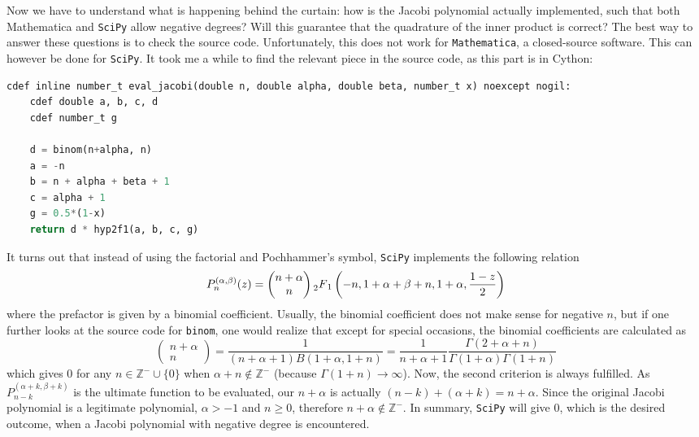 Now we have to understand what is happening behind the curtain: how is the Jacobi polynomial actually implemented, such that both Mathematica and \texttt{SciPy} allow negative degrees?
Will this guarantee that the quadrature of the inner product is correct?
The best way to answer these questions is to check the source code.
Unfortunately, this does not work for \texttt{Mathematica}, a closed-source software.
This can however be done for \texttt{SciPy}.
It took me a while to find the relevant piece in the source code, as this part is in Cython:
\begin{lstlisting}[language=Python]
cdef inline number_t eval_jacobi(double n, double alpha, double beta, number_t x) noexcept nogil:
    cdef double a, b, c, d
    cdef number_t g

    d = binom(n+alpha, n)
    a = -n
    b = n + alpha + beta + 1
    c = alpha + 1
    g = 0.5*(1-x)
    return d * hyp2f1(a, b, c, g)
\end{lstlisting}
It turns out that instead of using the factorial and Pochhammer's symbol, \texttt{SciPy} implements the following relation
\[
    P_n^{(\alpha,\beta)}(z) = \begin{pmatrix}n+\alpha \\ n\end{pmatrix}\prescript{}{2}{F}_1\left(-n, 1+\alpha+\beta+n, 1+\alpha, \frac{1-z}{2}\right)
\]
where the prefactor is given by a binomial coefficient. Usually, the binomial coefficient does not make sense for negative $n$, but if one further looks at the source code for \texttt{binom}, one would realize that except for special occasions, the binomial coefficients are calculated as
\[
    \begin{pmatrix} n + \alpha \\ n \end{pmatrix} = \frac{1}{(n + \alpha + 1)B(1 + \alpha, 1 + n)} = \frac{1}{n + \alpha + 1} \frac{\Gamma(2 + \alpha + n)}{\Gamma(1 + \alpha) \Gamma(1 + n)}
\]
which gives $0$ for any $n\in \mathbb{Z}^- \cup \{0\}$ when $\alpha + n \notin \mathbb{Z}^-$ (because $\Gamma(1+n)\rightarrow \infty$). Now, the second criterion is always fulfilled. As $P_{n-k}^{(\alpha + k, \beta + k)}$ is the ultimate function to be evaluated, our $n+\alpha$ is actually $(n-k)+(\alpha +k) = n+\alpha$. Since the original Jacobi polynomial is a legitimate polynomial, $\alpha > -1$ and $n\geq 0$, therefore $n+\alpha \notin \mathbb{Z}^-$. In summary, \texttt{SciPy} will give $0$, which is the desired outcome, when a Jacobi polynomial with negative degree is encountered.


